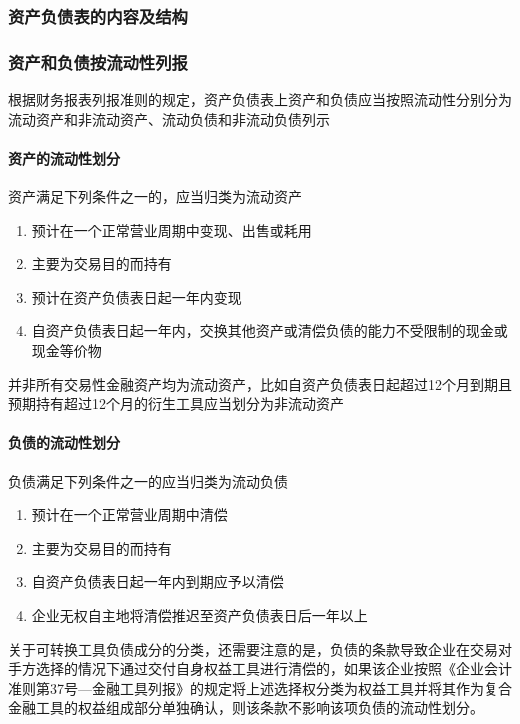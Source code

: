 \documentclass[UTF8,12pt]{ctexart}
\numberwithin{equation}{section} %
\numberwithin{figure}{section}
\numberwithin{table}{section}
\begin{document}
	\subsubsection{资产负债表的内容及结构}
	
	\subsubsection{资产和负债按流动性列报}
	根据财务报表列报准则的规定，资产负债表上资产和负债应当按照流动性分别分为流动资产和非流动资产、流动负债和非流动负债列示
	\paragraph{资产的流动性划分}
	资产满足下列条件之一的，应当归类为流动资产
	\begin{enumerate}
		\item 预计在一个正常营业周期中变现、出售或耗用
		
		\item 主要为交易目的而持有
		
		\item 预计在资产负债表日起一年内变现
		
		\item 自资产负债表日起一年内，交换其他资产或清偿负债的能力不受限制的现金或现金等价物
	\end{enumerate}
	
	并非所有交易性金融资产均为流动资产，比如自资产负债表日起超过12个月到期且预期持有超过12个月的衍生工具应当划分为非流动资产
	
	\paragraph{负债的流动性划分}
	负债满足下列条件之一的应当归类为流动负债
	\begin{enumerate}
		\item 预计在一个正常营业周期中清偿
		
		\item 主要为交易目的而持有
		
		\item 自资产负债表日起一年内到期应予以清偿
		
		\item 企业无权自主地将清偿推迟至资产负债表日后一年以上
	\end{enumerate}
	
	关于可转换工具负债成分的分类，还需要注意的是，负债的条款导致企业在交易对手方选择的情况下通过交付自身权益工具进行清偿的，如果该企业按照《企业会计准则第37号—金融工具列报》的规定将上述选择权分类为权益工具并将其作为复合金融工具的权益组成部分单独确认，则该条款不影响该项负债的流动性划分。
	
\end{document}
